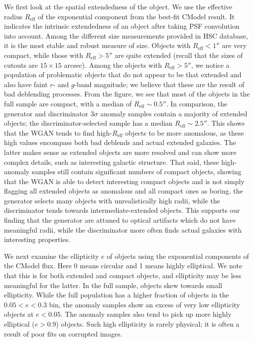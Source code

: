 We first look at the spatial extendedness of the object.
We use the effective radius $R_\mathrm{eff}$ of the exponential component from the best-fit CModel result. 
It indicates the intrinsic extendedness of an object after taking PSF convolution into account. 
Among the different size measurements provided in HSC database, it is the most stable and robust measure of size.
Objects with $R_\mathrm{eff}<1''$ are very compact, while those with $R_\mathrm{eff}>5''$ are quite extended (recall that the sizes of cutouts are $15 \times 15$ arcsec).
Among the objects with $R_\mathrm{eff}>5''$, we notice a population of problematic objects that do not appear to be that extended and also have faint $r$- and $g$-band magnitude; we believe that these are the result of bad deblending processes.
From the figure, we see that most of the objects in the full sample are compact, with a median of $R_\mathrm{eff}\sim0.5''$. 
In comparison, the generator and discriminator $3\sigma$ anomaly samples contain a majority of extended objects; the discriminator-selected sample has a median $R_\mathrm{eff}\sim2.5''$.
This shows that the WGAN tends to find high-$R_\mathrm{eff}$ objects to be more anomalous, as these high values encompass both bad deblends and actual extended galaxies.
The latter makes sense as extended objects are more resolved and can show more complex details, such as interesting galactic structure.
That said, these high-anomaly samples still contain significant numbers of compact objects, showing that the WGAN is able to detect interesting compact objects and is not simply flagging all extended objects as anomalous and all compact ones as boring.
 the generator selects many objects with unrealistically high radii, while the discriminator tends towards intermediate-extended objects.
This supports our finding that the generator  are attuned to optical artifacts which do not have meaningful radii, while the discriminator more often finds actual galaxies with interesting properties.

We next examine the ellipticity $e$ of objects using the exponential components of the CModel flux.
Here 0 means circular and 1 means highly elliptical.
We note that this is for both extended and compact objects, and ellipticity may be less meaningful for the latter.
In the full sample, objects skew towards small ellipticity.
While the full population has a higher fraction of objects in the $0.05 < e < 0.3$ bin, the anomaly samples show an excess of very low ellipticity objects at $e < 0.05$.
The anomaly samples also tend to pick up more highly elliptical ($e>0.9$) objects. 
Such high ellipticity is rarely physical; it is often a result of poor fits on corrupted images.

